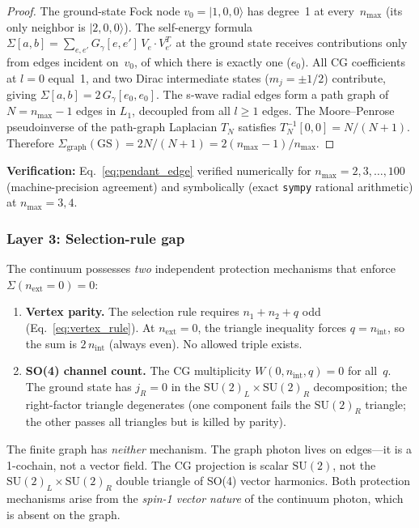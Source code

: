 \documentclass[11pt]{article}
\begin{document}
\begin{proof}
The ground-state Fock node $v_0 = |1,0,0\rangle$ has degree~1 at
every~$n_{\max}$ (its only neighbor is $|2,0,0\rangle$).  The
self-energy formula $\Sigma[a,b] = \sum_{e,e'} G_\gamma[e,e']\, V_e
\cdot V_{e'}^T$ at the ground state receives contributions only from
edges incident on~$v_0$, of which there is exactly one ($e_0$).
All CG coefficients at $l = 0$ equal~1, and two Dirac intermediate
states ($m_j = \pm 1/2$) contribute, giving
$\Sigma[a,b] = 2\, G_\gamma[e_0, e_0]$.  The s-wave radial
edges form a path graph of $N = n_{\max} - 1$ edges in $L_1$,
decoupled from all $l \ge 1$ edges.  The Moore--Penrose pseudoinverse
of the path-graph Laplacian $T_N$ satisfies
$T_N^{-1}[0,0] = N/(N+1)$.  Therefore
$\Sigma_{\mathrm{graph}}(\mathrm{GS}) = 2N/(N+1)
= 2(n_{\max}-1)/n_{\max}$.
\end{proof}

\noindent\textbf{Verification:} Eq.~\eqref{eq:pendant_edge} verified
numerically for $n_{\max} = 2, 3, \ldots, 100$ (machine-precision
agreement) and symbolically (exact \texttt{sympy} rational arithmetic)
at $n_{\max} = 3, 4$.

\subsubsection{Layer 3: Selection-rule gap}

The continuum possesses \emph{two} independent protection mechanisms
that enforce $\Sigma(n_{\mathrm{ext}} = 0) = 0$:
\begin{enumerate}
\item \textbf{Vertex parity.}  The selection rule requires
  $n_1 + n_2 + q$ odd (Eq.~\eqref{eq:vertex_rule}).  At
  $n_{\mathrm{ext}} = 0$, the triangle inequality forces
  $q = n_{\mathrm{int}}$, so the sum is $2\,n_{\mathrm{int}}$
  (always even).  No allowed triple exists.
\item \textbf{SO(4) channel count.}  The CG multiplicity
  $W(0, n_{\mathrm{int}}, q) = 0$ for all~$q$.  The ground state has
  $j_R = 0$ in the $\mathrm{SU}(2)_L \times \mathrm{SU}(2)_R$
  decomposition; the right-factor triangle degenerates (one component
  fails the $\mathrm{SU}(2)_R$ triangle; the other passes all
  triangles but is killed by parity).
\end{enumerate}
The finite graph has \emph{neither} mechanism.  The graph photon lives
on edges---it is a 1-cochain, not a vector field.  The CG projection
is scalar $\mathrm{SU}(2)$, not the $\mathrm{SU}(2)_L \times
\mathrm{SU}(2)_R$ double triangle of SO(4) vector harmonics.  Both
protection mechanisms arise from the \emph{spin-1 vector nature} of
the continuum photon, which is absent on the graph.
\end{document}
